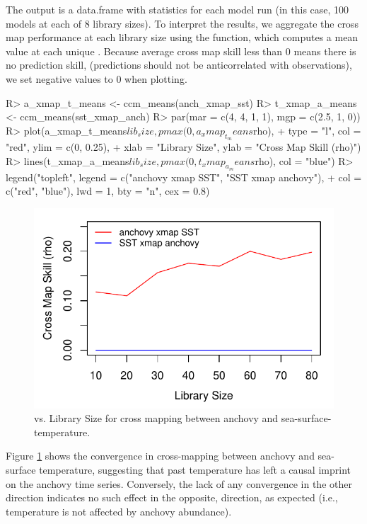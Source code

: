 \documentclass[article]{jss}
\begin{document}
The output is a data.frame with statistics for each model run (in this case, 100 models at each of 8 library sizes). To interpret the results, we aggregate the cross map performance at each library size using the  function, which computes a mean value at each unique . Because average cross map skill less than 0 means there is no prediction skill, (predictions should not be anticorrelated with observations), we set negative values to 0 when plotting.

\begin{Schunk}
\begin{Sinput}
R> a_xmap_t_means <- ccm_means(anch_xmap_sst)
R> t_xmap_a_means <- ccm_means(sst_xmap_anch)
R> par(mar = c(4, 4, 1, 1), mgp = c(2.5, 1, 0))
R> plot(a_xmap_t_means$lib_size, pmax(0, a_xmap_t_means$rho), 
+       type = "l", col = "red", ylim = c(0, 0.25), 
+       xlab = "Library Size", ylab = "Cross Map Skill (rho)")
R> lines(t_xmap_a_means$lib_size, pmax(0, t_xmap_a_means$rho), col = "blue")
R> legend("topleft", legend = c("anchovy xmap SST", "SST xmap anchovy"),
+         col = c("red", "blue"), lwd = 1, bty = "n", cex = 0.8)
\end{Sinput}
\end{Schunk}

\begin{figure}[t!]
\begin{center}
\includegraphics[width=4.5in]{article-ccm-anchovy-sst}
\end{center}
\caption{\label{fig:ccm-anchovy-sst}  vs. Library Size for cross mapping between anchovy and sea-surface-temperature.}
\end{figure}

Figure \ref{fig:ccm-anchovy-sst} shows the convergence in cross-mapping between anchovy and sea-surface temperature, suggesting that past temperature has left a causal imprint on the anchovy time series. Conversely, the lack of any convergence in the other direction indicates no such effect in the opposite, direction, as expected (i.e., temperature is not affected by anchovy abundance).
\end{document}

